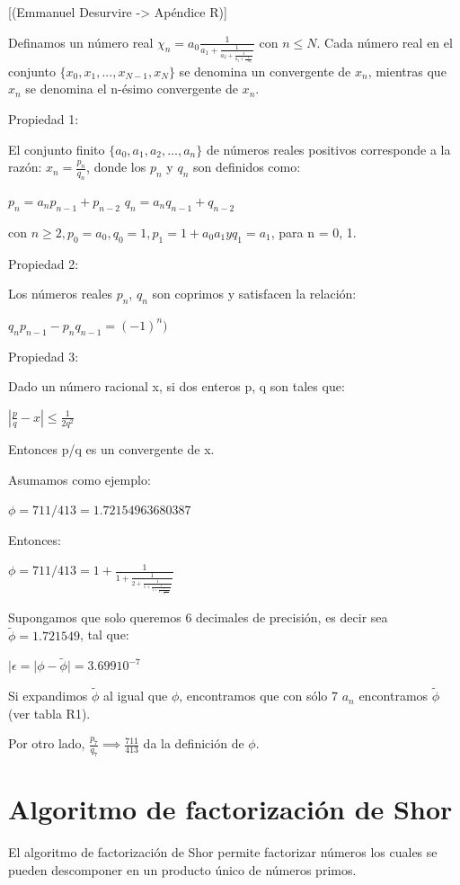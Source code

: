 [(Emmanuel Desurvire -> Apéndice R)]

Definamos un número real $\chi_n = a_0 \frac{1}{a_1 + \frac{1}{a_2 + \frac{1}{a_3 + \frac{1}{... a_n}}}}$ con $n \leq N$. Cada número real en el conjunto $\{x_0,x_1,...,x_{N-1},x_N\}$ se denomina un convergente de $x_n$, mientras que $x_n$ se denomina el n-ésimo convergente de $x_n$.

Propiedad 1:

El conjunto finito $\{a_0,a_1,a_2,...,a_n\}$ de números reales positivos corresponde a la razón: $x_n = \frac{p_n}{q_n}$, donde los $p_n$ y $q_n$ son definidos como:

$p_n = a_n p_{n-1} + p_{n-2}$
$q_n = a_n q_{n-1} + q_{n-2}$

con $n \geq 2, p_0 = a_0, q_0 = 1, p_1 = 1 + a_0 a_1 y q_1 = a_1$, para n = 0, 1.

Propiedad 2:

Los números reales $p_n$, $q_n$ son coprimos y satisfacen la relación:

$q_n p_{n-1} - p_n q_{n-1} = (-1)^n)$

Propiedad 3:

Dado un número racional x, si dos enteros p, q son tales que:

$|\frac{p}{q} - x| \leq \frac{1}{2q^2}$

Entonces p/q es un convergente de x.

Asumamos como ejemplo:

$\phi = 711/413 = 1.72154963680387$

Entonces:

$\phi = 711/413 = 1 + \frac{1}{1 + \frac{1}{2 + \frac{1}{1 + \frac{1}{1 + \frac{1}{2 + \frac{1}{4 + \frac{1}{5}}}}}}}$

Supongamos que solo queremos 6 decimales de precisión, es decir sea $\tilde{\phi} = 1.721549$, tal que:

$|\epsilon = |\phi - \tilde{\phi}| = 3.699 10^{-7}$

Si expandimos $\tilde{\phi}$ al igual que $\phi$, encontramos que con sólo 7 $a_n$ encontramos $\tilde{\phi}$ (ver tabla R1).

Por otro lado, $\frac{p_7}{q_7} \implies \frac{711}{413}$ da la definición de $\phi$.

\section{Algoritmo de factorización de Shor}

El algoritmo de factorización de Shor permite factorizar números los cuales se pueden descomponer en un producto único de números primos.

